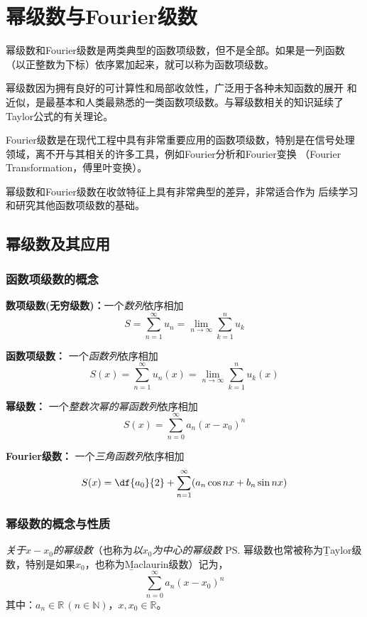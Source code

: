 \setcounter{chapter}{12}

\chapter{幂级数与Fourier级数}

幂级数和Fourier级数是两类典型的函数项级数，但不是全部。如果是一列函数
（以正整数为下标）依序累加起来，就可以称为函数项级数。

幂级数因为拥有良好的可计算性和局部收敛性，广泛用于各种未知函数的展开
和近似，是最基本和人类最熟悉的一类函数项级数。与幂级数相关的知识延续了
Taylor公式的有关理论。

Fourier级数是在现代工程中具有非常重要应用的函数项级数，特别是在信号处理
领域，离不开与其相关的许多工具，例如Fourier分析和Fourier变换
（Fourier Transformation，傅里叶变换）。

幂级数和Fourier级数在收敛特征上具有非常典型的差异，非常适合作为
后续学习和研究其他函数项级数的基础。

\section{幂级数及其应用}

\subsection{函数项级数的概念}

{\bf 数项级数(无穷级数)：}一个{\it 数列}依序相加
$$S=\sum\limits_{n=1}^{\infty}u_n
=\lim\limits_{n\to\infty}\sum\limits_{k=1}^nu_k$$ 

{\bf 函数项级数：} 一个{\it 函数列}依序相加 
$$S(x)=\sum\limits_{n=1}^{\infty}u_n(x)
=\lim\limits_{n\to\infty}\sum\limits_{k=1}^nu_k(x)$$

{\bf 幂级数：} 一个{\it 整数次幂的幂函数列}依序相加
$$S(x)=\sum\limits_{n=0}^{\infty}a_n(x-x_0)^n$$ 

{\bf Fourier级数：} 一个{\it 三角函数列}依序相加
$$S(x)=\df{a_0}{2}+\sum\limits_{n=1}^{\infty}
(a_n\cos nx+b_n\sin nx)$$

\subsection{幂级数的概念与性质}

{\it 关于$x-x_0$的幂级数}（也称为{\it 以$x_0$为中心的幂级数}
\ps{幂级数也常被称为{\b Taylor级数}，特别是如果$x_0$，也称为{\b Maclaurin级数}}）记为，
$${\sum\limits_{n=0}^{\infty}a_n(x-x_0)^n}$$
其中：$a_n\in\mathbb{R}\,(n\in\mathbb{N})$，$x,x_0\in\mathbb{R}$。

